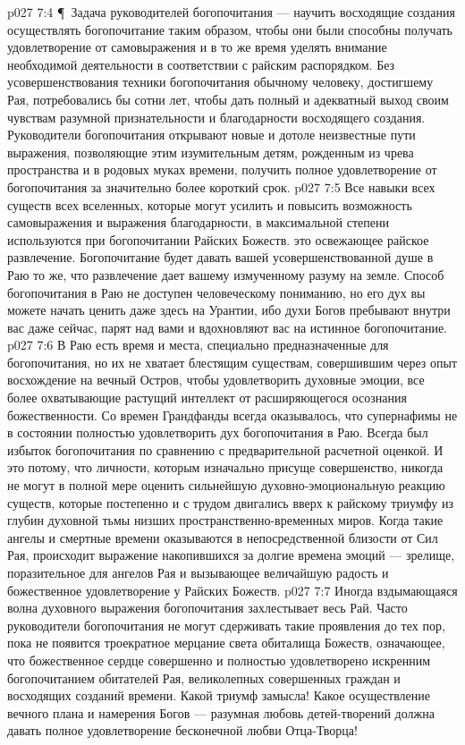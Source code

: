\vs p027 7:4 \P\ Задача руководителей богопочитания --- научить восходящие создания осуществлять богопочитание таким образом, чтобы они были способны получать удовлетворение от самовыражения и в то же время уделять внимание необходимой деятельности в соответствии с райским распорядком. Без усовершенствования техники богопочитания обычному человеку, достигшему Рая, потребовались бы сотни лет, чтобы дать полный и адекватный выход своим чувствам разумной признательности и благодарности восходящего создания. Руководители богопочитания открывают новые и дотоле неизвестные пути выражения, позволяющие этим изумительным детям, рожденным из чрева пространства и в родовых муках времени, получить полное удовлетворение от богопочитания за значительно более короткий срок.
\vs p027 7:5 Все навыки всех существ всех вселенных, которые могут усилить и повысить возможность самовыражения и выражения благодарности, в максимальной степени используются при богопочитании Райских Божеств.   это освежающее райское развлечение. Богопочитание будет давать вашей усовершенствованной душе в Раю то же, что развлечение дает вашему измученному разуму на земле. Способ богопочитания в Раю не доступен человеческому пониманию, но его дух вы можете начать ценить даже здесь на Урантии, ибо духи Богов пребывают внутри вас даже сейчас, парят над вами и вдохновляют вас на истинное богопочитание.
\vs p027 7:6 В Раю есть время и места, специально предназначенные для богопочитания, но их не хватает блестящим существам, совершившим через опыт восхождение на вечный Остров, чтобы удовлетворить духовные эмоции, все более охватывающие растущий интеллект от расширяющегося осознания божественности. Со времен Грандфанды всегда оказывалось, что супернафимы не в состоянии полностью удовлетворить дух богопочитания в Раю. Всегда был избыток богопочитания по сравнению с предварительной расчетной оценкой. И это потому, что личности, которым изначально присуще совершенство, никогда не могут в полной мере оценить сильнейшую духовно\hyp{}эмоциональную реакцию существ, которые постепенно и с трудом двигались вверх к райскому триумфу из глубин духовной тьмы низших пространственно\hyp{}временных миров. Когда такие ангелы и смертные времени оказываются в непосредственной близости от Сил Рая, происходит выражение накопившихся за долгие времена эмоций --- зрелище, поразительное для ангелов Рая и вызывающее величайшую радость и божественное удовлетворение у Райских Божеств.
\vs p027 7:7 Иногда вздымающаяся волна духовного выражения богопочитания захлестывает весь Рай. Часто руководители богопочитания не могут сдерживать такие проявления до тех пор, пока не появится троекратное мерцание света обиталища Божеств, означающее, что божественное сердце совершенно и полностью удовлетворено искренним богопочитанием обитателей Рая, великолепных совершенных граждан и восходящих созданий времени. Какой триумф замысла! Какое осуществление вечного плана и намерения Богов --- разумная любовь детей\hyp{}творений должна давать полное удовлетворение бесконечной любви Отца\hyp{}Творца!
